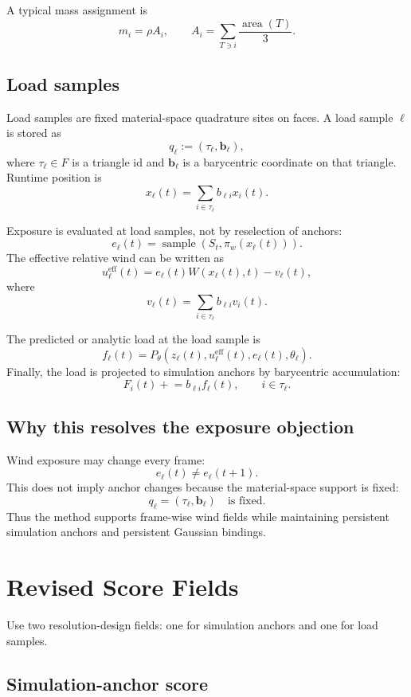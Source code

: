 \documentclass[11pt,a4paper]{article}
\begin{document}
A typical mass assignment is
\[
m_i = \rho A_i,\qquad
A_i=\sum_{T\ni i}\frac{\operatorname{area}(T)}{3}.
\]

\subsection{Load samples}

Load samples are fixed material-space quadrature sites on faces. A load sample $\ell$ is stored as
\[
q_\ell := (\tau_\ell,\mathbf{b}_\ell),
\]
where $\tau_\ell\in F$ is a triangle id and $\mathbf{b}_\ell$ is a barycentric coordinate on that triangle. Runtime position is
\[
x_\ell(t)=\sum_{i\in \tau_\ell} b_{\ell i}x_i(t).
\]

Exposure is evaluated at load samples, not by reselection of anchors:
\[
e_\ell(t)=\operatorname{sample}\left(S_t,\pi_w(x_\ell(t))\right).
\]
The effective relative wind can be written as
\[
u_\ell^{\mathrm{eff}}(t)=e_\ell(t)W(x_\ell(t),t)-v_\ell(t),
\]
where
\[
v_\ell(t)=\sum_{i\in \tau_\ell}b_{\ell i}v_i(t).
\]

The predicted or analytic load at the load sample is
\[
f_\ell(t)=P_\theta\left(z_\ell(t),u_\ell^{\mathrm{eff}}(t),e_\ell(t),\theta_\ell\right).
\]
Finally, the load is projected to simulation anchors by barycentric accumulation:
\[
F_i(t) \mathrel{+}= b_{\ell i} f_\ell(t),\qquad i\in \tau_\ell.
\]

\subsection{Why this resolves the exposure objection}

Wind exposure may change every frame:
\[
e_\ell(t)\neq e_\ell(t+1).
\]
This does not imply anchor changes because the material-space support is fixed:
\[
q_\ell=(\tau_\ell,\mathbf{b}_\ell)\quad\text{is fixed.}
\]
Thus the method supports frame-wise wind fields while maintaining persistent simulation anchors and persistent Gaussian bindings.

\section{Revised Score Fields}

Use two resolution-design fields: one for simulation anchors and one for load samples.

\subsection{Simulation-anchor score}
\end{document}
